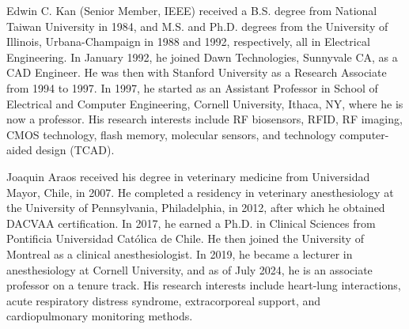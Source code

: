 \documentclass[journal,twoside,web]{ieeecolor}
\begin{document}
\begin{IEEEbiography}{Edwin C. Kan} (Senior Member, IEEE) received a B.S. degree from National Taiwan University in 1984, and M.S. and Ph.D. degrees from the University of Illinois, Urbana-Champaign in 1988 and 1992, respectively, all in Electrical Engineering. In January 1992, he joined Dawn Technologies, Sunnyvale CA, as a CAD Engineer. He was then with Stanford University as a Research Associate from 1994 to 1997. In 1997, he started as an Assistant Professor in School of Electrical and Computer Engineering, Cornell University, Ithaca, NY, where he is now a professor. His research interests include RF biosensors, RFID, RF imaging, CMOS technology, flash memory, molecular sensors, and technology computer-aided design (TCAD).
\end{IEEEbiography}

\begin{IEEEbiography}{Joaquin Araos} received his degree in veterinary medicine from Universidad Mayor, Chile, in 2007. He completed a residency in veterinary anesthesiology at the University of Pennsylvania, Philadelphia, in 2012, after which he obtained DACVAA certification. In 2017, he earned a Ph.D. in Clinical Sciences from Pontificia Universidad Católica de Chile. He then joined the University of Montreal as a clinical anesthesiologist. In 2019, he became a lecturer in anesthesiology at Cornell University, and as of July 2024, he is an associate professor on a tenure track. His research interests include heart-lung interactions, acute respiratory distress syndrome, extracorporeal support, and cardiopulmonary monitoring methods.
\end{IEEEbiography}
\end{document}
